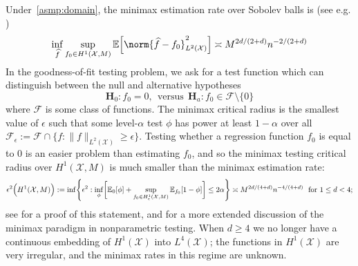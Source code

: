 \documentclass[twoside]{article}
\newcommand{\1}{\mathbf{1}}
\newcommand{\Xset}{\mathcal{X}}
\newcommand{\Leb}{L}
\newcommand{\mc}[1]{\mathcal{#1}}
\newcommand{\Ebb}{\mathbb{E}}
\newcommand{\wh}[1]{\widehat{#1}}
\theoremstyle{definition}
\theoremstyle{remark}
\begin{document}
Under~\ref{asmp:domain}, the minimax estimation rate over Sobolev balls is (see e.g. \citep{tsybakov2008_book})
\begin{equation}
\label{eqn:sobolev_space_estimation_minimax_rate}
\inf_{\wh{f}} \sup_{f_0 \in H^1(\Xset, M)} \Ebb\Bigl[\norm{\wh{f} - f_0}_{L^2(\Xset)}^2\Bigr] \asymp M^{2d/(2 + d)}n^{-2/(2 + d)}
\end{equation}
In the goodness-of-fit testing problem, we ask for a test function which can distinguish between the null and alternative hypotheses
\begin{equation}
\mathbf{H}_0: f_0 = 0, ~~\textrm{versus}~~ \mathbf{H}_a: f_0 \in \mc{F} \setminus \{0\}
\end{equation} 
where $\mc{F}$ is some class of functions. The minimax critical radius is the smallest value of $\epsilon$ such that some level-${\alpha}$ test $\phi$ has power at least $1 - \alpha$ over all $\mc{F}_{\epsilon} := \mc{F} \cap \{f: \|f\|_{\Leb^2(\Xset)} \geq \epsilon\}$. Testing whether a regression function $f_0$ is equal to $0$ is an easier problem than estimating $f_0$, and so the minimax testing critical radius over $H^1(\Xset,M)$ is much smaller than the minimax estimation rate:
\begin{equation}
\label{eqn:sobolev_space_testing_critical_radius}
\epsilon^2\Bigl(H^1(\Xset,M)\Bigr):= \inf\Biggl\{\epsilon^2: \inf_{\phi} \biggl[\Ebb_0[\phi] +  \sup_{f_0 \in H_{\epsilon}^1(\Xset,M)} \Ebb_{f_0}[1 - \phi]\biggr] \leq 2\alpha \Biggr\} \asymp M^{2d/(4 + d)}n^{-4/(4 + d)}~~\textrm{for $1 \leq d < 4$;}
\end{equation}
see \cite{ingster09} for a proof of this statement, and \cite{ariascastro2018} for a more extended discussion of the minimax paradigm in nonparametric testing. When $d \geq 4$ we no longer have a continuous embedding of $H^1(\Xset)$ into $\Leb^4(\Xset)$; the functions in $H^1(\Xset)$ are very irregular, and the minimax rates in this regime are unknown. 
\end{document}
